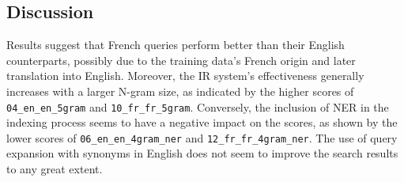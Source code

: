 
\subsection{Discussion}\label{subsec:general-results}

Results suggest that French queries perform better than their English counterparts, possibly due to the training data's
French origin and later translation into English.
Moreover, the IR system's effectiveness generally increases with a larger N-gram size, as indicated by the higher scores
of \texttt{04\_en\_en\_5gram} and \texttt{10\_fr\_fr\_5gram}.
Conversely, the inclusion of NER in the indexing process seems to have a negative impact on the scores, as shown by the
lower scores of \texttt{06\_en\_en\_4gram\_ner} and \texttt{12\_fr\_fr\_4gram\_ner}.
The use of query expansion with synonyms in English does not seem to improve the search results to any great extent.\\

